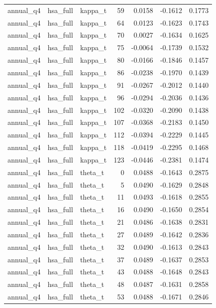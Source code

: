 \begin{tabular}{lllrrrr}
annual\_q4 & hsa\_full & kappa\_t & 59 & 0.0158 & -0.1612 & 0.1773 \\
annual\_q4 & hsa\_full & kappa\_t & 64 & 0.0123 & -0.1623 & 0.1743 \\
annual\_q4 & hsa\_full & kappa\_t & 70 & 0.0027 & -0.1634 & 0.1625 \\
annual\_q4 & hsa\_full & kappa\_t & 75 & -0.0064 & -0.1739 & 0.1532 \\
annual\_q4 & hsa\_full & kappa\_t & 80 & -0.0166 & -0.1846 & 0.1457 \\
annual\_q4 & hsa\_full & kappa\_t & 86 & -0.0238 & -0.1970 & 0.1439 \\
annual\_q4 & hsa\_full & kappa\_t & 91 & -0.0267 & -0.2012 & 0.1440 \\
annual\_q4 & hsa\_full & kappa\_t & 96 & -0.0294 & -0.2036 & 0.1436 \\
annual\_q4 & hsa\_full & kappa\_t & 102 & -0.0320 & -0.2090 & 0.1438 \\
annual\_q4 & hsa\_full & kappa\_t & 107 & -0.0368 & -0.2183 & 0.1450 \\
annual\_q4 & hsa\_full & kappa\_t & 112 & -0.0394 & -0.2229 & 0.1445 \\
annual\_q4 & hsa\_full & kappa\_t & 118 & -0.0419 & -0.2295 & 0.1468 \\
annual\_q4 & hsa\_full & kappa\_t & 123 & -0.0446 & -0.2381 & 0.1474 \\
annual\_q4 & hsa\_full & theta\_t & 0 & 0.0488 & -0.1643 & 0.2875 \\
annual\_q4 & hsa\_full & theta\_t & 5 & 0.0490 & -0.1629 & 0.2848 \\
annual\_q4 & hsa\_full & theta\_t & 11 & 0.0493 & -0.1618 & 0.2855 \\
annual\_q4 & hsa\_full & theta\_t & 16 & 0.0490 & -0.1650 & 0.2854 \\
annual\_q4 & hsa\_full & theta\_t & 21 & 0.0486 & -0.1638 & 0.2831 \\
annual\_q4 & hsa\_full & theta\_t & 27 & 0.0489 & -0.1642 & 0.2836 \\
annual\_q4 & hsa\_full & theta\_t & 32 & 0.0490 & -0.1613 & 0.2843 \\
annual\_q4 & hsa\_full & theta\_t & 37 & 0.0489 & -0.1637 & 0.2853 \\
annual\_q4 & hsa\_full & theta\_t & 43 & 0.0488 & -0.1648 & 0.2843 \\
annual\_q4 & hsa\_full & theta\_t & 48 & 0.0487 & -0.1631 & 0.2858 \\
annual\_q4 & hsa\_full & theta\_t & 53 & 0.0488 & -0.1671 & 0.2846 \\

\end{tabular}
